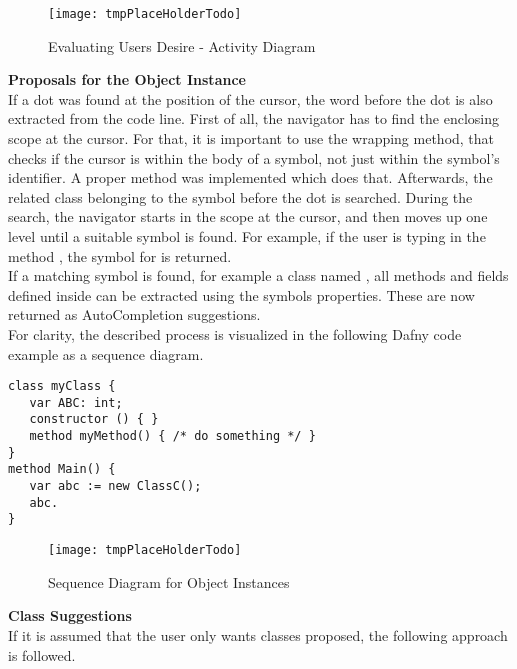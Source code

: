 \begin{figure}[H]
    \centering
    \texttt{[image: tmpPlaceHolderTodo]}
    \caption{Evaluating Users Desire - Activity Diagram}
    \label{fig:get_users_desire}
\end{figure}

\textbf{Proposals for the Object Instance}\\
If a dot was found at the position of the cursor, the word before the dot is also extracted from the code line.
First of all, the navigator has to find the enclosing scope at the cursor.
For that, it is important to use the wrapping method, that checks if the cursor is within the body of a symbol, not just within the symbol's identifier.
A proper method was implemented which does that.
Afterwards, the related class belonging to the symbol before the dot is searched.
During the search, the navigator starts in the scope at the cursor, and then moves up one level until a suitable symbol is found.
For example, if the user is typing in the method , the symbol for  is returned. \\

If a matching symbol is found, for example a class named , all methods and fields defined inside 
can be extracted using the symbols properties.
These are now returned as AutoCompletion suggestions. \\

For clarity, the described process is visualized in the following
Dafny code example  as a sequence diagram.

\begin{lstlisting}[language=dafny, caption={tmptodo.dfy}, captionpos=b, label={lst:tmptodo}]
class myClass {
   var ABC: int;
   constructor () { }
   method myMethod() { /* do something */ }
}
method Main() {
   var abc := new ClassC();
   abc.
}
\end{lstlisting}


\begin{figure}[H]
    \centering
    \texttt{[image: tmpPlaceHolderTodo]}
    \caption{Sequence Diagram for Object Instances}
    \label{fig:object_completion_diagram}
\end{figure}

\textbf{Class Suggestions}\\
If it is assumed that the user only wants classes proposed, the following approach is followed.


